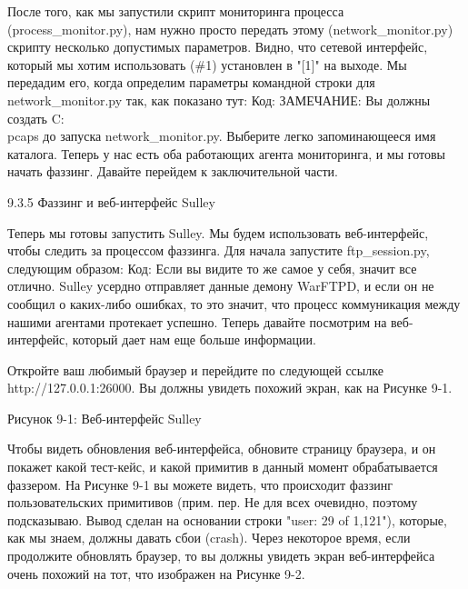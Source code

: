 \documentclass[12pt]{book}
\begin{document}
После того, как мы запустили скрипт мониторинга процесса (process\_monitor.py), нам нужно просто передать этому (network\_monitor.py) скрипту несколько допустимых параметров. Видно, что сетевой интерфейс, который мы хотим использовать (\#1) установлен в "[1]" на выходе. Мы передадим его, когда определим параметры командной строки для network\_monitor.py так, как показано тут:
Код:
ЗАМЕЧАНИЕ: Вы должны создать C:\\pcaps до запуска network\_monitor.py. Выберите легко запоминающееся имя каталога.
Теперь у нас есть оба работающих агента мониторинга, и мы готовы начать фаззинг. Давайте перейдем к заключительной части.

9.3.5 Фаззинг и веб-интерфейс Sulley

Теперь мы готовы запустить Sulley. Мы будем использовать веб-интерфейс, чтобы следить за процессом фаззинга. Для начала запустите ftp\_session.py, следующим образом:
Код:
Если вы видите то же самое у себя, значит все отлично. Sulley усердно отправляет данные демону WarFTPD, и если он не сообщил о каких-либо ошибках, то это значит, что процесс коммуникация между нашими агентами протекает успешно. Теперь давайте посмотрим на веб-интерфейс, который дает нам еще больше информации.

Откройте ваш любимый браузер и перейдите по следующей ссылке http://127.0.0.1:26000. Вы должны увидеть похожий экран, как на Рисунке 9-1.




Рисунок 9-1: Веб-интерфейс Sulley

Чтобы видеть обновления веб-интерфейса, обновите страницу браузера, и он покажет какой тест-кейс, и какой примитив в данный момент обрабатывается фаззером. На Рисунке 9-1 вы можете видеть, что происходит фаззинг пользовательских примитивов (прим. пер. Не для всех очевидно, поэтому подсказываю. Вывод сделан на основании строки "user: 29 of 1,121"), которые, как мы знаем, должны давать сбои (crash). Через некоторое время, если продолжите обновлять браузер, то вы должны увидеть экран веб-интерфейса очень похожий на тот, что изображен на Рисунке 9-2.
\end{document}
